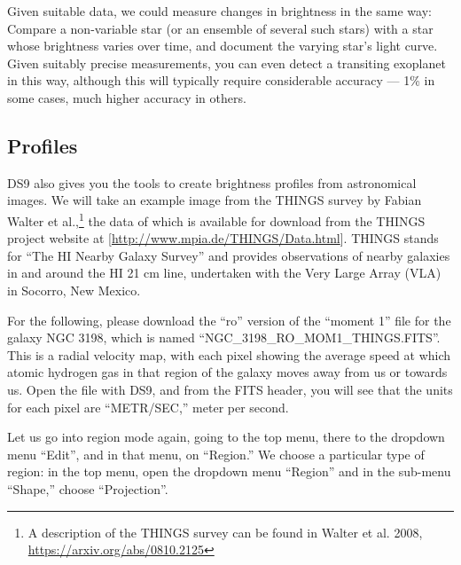 \documentclass[twocolumn,apj]{openjournal}
\begin{document}
Given suitable data, we could measure changes in brightness in the same way: Compare a non-variable star (or an ensemble of several such stars) with a star whose brightness varies over time, and document the varying star's light curve. Given suitably precise measurements, you can even detect a transiting exoplanet in this way, although this will typically require considerable accuracy --- 1\% in some cases, much higher accuracy in others.

\subsection{Profiles}

DS9 also gives you the tools to create brightness profiles from astronomical images. We will take an example image from the THINGS survey by Fabian Walter et al.,\footnote{A description of the THINGS survey can be found in Walter et al. 2008, \href{https://arxiv.org/abs/0810.2125}{https://arxiv.org/abs/0810.2125}} the data of which is available for download from the THINGS project website at [\href{http://www.mpia.de/THINGS/Data.html}{http://www.mpia.de/THINGS/Data.html}]. THINGS stands for ``The HI Nearby Galaxy Survey'' and provides observations of nearby galaxies in and around the HI 21 cm line, undertaken with the Very Large Array (VLA) in Socorro, New Mexico.

For the following, please download the ``ro'' version of the ``moment 1'' file for the galaxy NGC 3198, which is named ``NGC\_3198\_RO\_MOM1\_THINGS.FITS''. This is a radial velocity map, with each pixel showing the average speed at which atomic hydrogen gas in that region of the galaxy moves away from us or towards us. Open the file with DS9, and from the FITS header, you will see that the units for each pixel are ``METR/SEC,'' meter per second.

Let us go into region mode again,  going to the top menu, there to the dropdown menu ``Edit'', and in that menu, on ``Region.'' We choose a particular type of region: in the top menu, open the dropdown menu ``Region'' and in the sub-menu ``Shape,'' choose ``Projection''.
\end{document}
